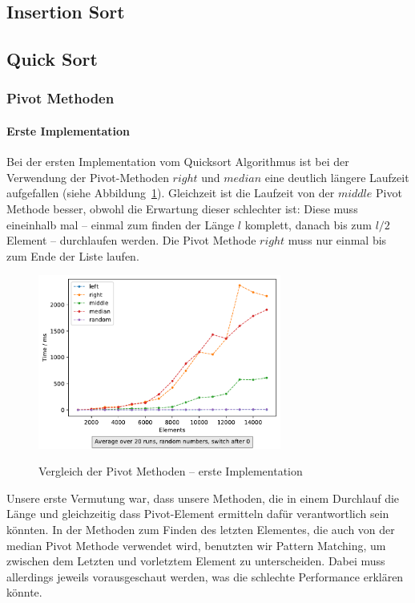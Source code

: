 \subsection{Insertion Sort}\label{subsec:insertion-sort-laufzeit}

\subsection{Quick Sort}\label{subsec:quick-sort-laufzeit}

\subsubsection{Pivot Methoden}

\paragraph{Erste Implementation}
Bei der ersten Implementation vom Quicksort Algorithmus ist bei der
Verwendung der Pivot-Methoden \(right\) und \(median\)  eine deutlich längere
Laufzeit aufgefallen (siehe Abbildung~\ref{fig:qsort-first-impl}).
Gleichzeit ist die Laufzeit von der \(middle\) Pivot Methode besser, obwohl
die Erwartung dieser schlechter ist:
Diese muss eineinhalb mal -- einmal zum finden der Länge \(l\) komplett, danach
bis zum \(l/2\) Element -- durchlaufen werden.
Die Pivot Methode \(right\) muss nur einmal bis zum Ende der Liste laufen.

\begin{figure}[hbt]
    \caption{Vergleich der Pivot Methoden -- erste Implementation}
    \centering
    \includegraphics[width = 8cm]
    {../out/pivotMethods_Implementation1.pdf}\label{fig:qsort-first-impl}
\end{figure}

Unsere erste Vermutung war, dass unsere Methoden, die in einem
Durchlauf die Länge und gleichzeitig dass Pivot-Element ermitteln dafür
verantwortlich sein könnten.
In der Methoden zum Finden des letzten Elementes, die auch von der median
Pivot Methode verwendet wird, benutzten wir Pattern Matching, um zwischen dem
Letzten und vorletztem Element zu unterscheiden.
Dabei muss allerdings jeweils vorausgeschaut werden, was die schlechte
Performance erklären könnte.

